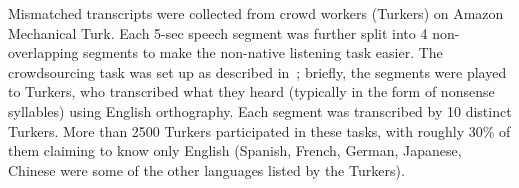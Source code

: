 \label{sec:methodsmc}

Mismatched transcripts were collected from crowd workers (Turkers)
on Amazon Mechanical Turk.
Each 5-sec speech segment was further split into 4
non-overlapping segments to make the non-native listening task
easier. The crowdsourcing task was set up as described
in~\cite{JHJ15b}; briefly, the segments were played to Turkers,
who transcribed what they heard (typically in the form of nonsense
syllables) using English orthography. Each segment was
transcribed by 10 distinct Turkers. More than 2500 Turkers
participated in these tasks, with roughly 30\% of them claiming to
know only English (Spanish, French, German, Japanese, Chinese were
some of the other languages listed by the Turkers).

